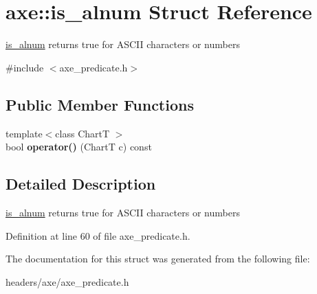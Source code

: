 \hypertarget{structaxe_1_1is__alnum}{\section{axe\+:\+:is\+\_\+alnum Struct Reference}
\label{structaxe_1_1is__alnum}
}


\hyperlink{structaxe_1_1is__alnum}{is\+\_\+alnum} returns true for A\+S\+C\+I\+I characters or numbers  




{\ttfamily \#include $<$axe\+\_\+predicate.\+h$>$}

\subsection*{Public Member Functions}
\begin{DoxyCompactItemize}
\item 
\hypertarget{structaxe_1_1is__alnum_a3664b783bb720059598f252317523111}{{\footnotesize template$<$class Chart\+T $>$ }\\bool {\bfseries operator()} (Chart\+T c) const }\label{structaxe_1_1is__alnum_a3664b783bb720059598f252317523111}

\end{DoxyCompactItemize}


\subsection{Detailed Description}
\hyperlink{structaxe_1_1is__alnum}{is\+\_\+alnum} returns true for A\+S\+C\+I\+I characters or numbers 

Definition at line 60 of file axe\+\_\+predicate.\+h.



The documentation for this struct was generated from the following file\+:\begin{DoxyCompactItemize}
\item 
headers/axe/axe\+\_\+predicate.\+h\end{DoxyCompactItemize}
